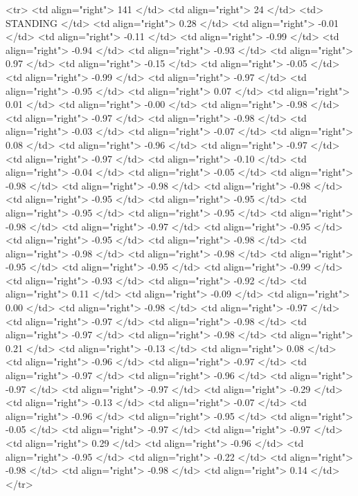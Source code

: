   <tr> <td align="right"> 141 </td> <td align="right">  24 </td> <td> STANDING </td> <td align="right"> 0.28 </td> <td align="right"> -0.01 </td> <td align="right"> -0.11 </td> <td align="right"> -0.99 </td> <td align="right"> -0.94 </td> <td align="right"> -0.93 </td> <td align="right"> 0.97 </td> <td align="right"> -0.15 </td> <td align="right"> -0.05 </td> <td align="right"> -0.99 </td> <td align="right"> -0.97 </td> <td align="right"> -0.95 </td> <td align="right"> 0.07 </td> <td align="right"> 0.01 </td> <td align="right"> -0.00 </td> <td align="right"> -0.98 </td> <td align="right"> -0.97 </td> <td align="right"> -0.98 </td> <td align="right"> -0.03 </td> <td align="right"> -0.07 </td> <td align="right"> 0.08 </td> <td align="right"> -0.96 </td> <td align="right"> -0.97 </td> <td align="right"> -0.97 </td> <td align="right"> -0.10 </td> <td align="right"> -0.04 </td> <td align="right"> -0.05 </td> <td align="right"> -0.98 </td> <td align="right"> -0.98 </td> <td align="right"> -0.98 </td> <td align="right"> -0.95 </td> <td align="right"> -0.95 </td> <td align="right"> -0.95 </td> <td align="right"> -0.95 </td> <td align="right"> -0.98 </td> <td align="right"> -0.97 </td> <td align="right"> -0.95 </td> <td align="right"> -0.95 </td> <td align="right"> -0.98 </td> <td align="right"> -0.98 </td> <td align="right"> -0.98 </td> <td align="right"> -0.95 </td> <td align="right"> -0.95 </td> <td align="right"> -0.99 </td> <td align="right"> -0.93 </td> <td align="right"> -0.92 </td> <td align="right"> 0.11 </td> <td align="right"> -0.09 </td> <td align="right"> 0.00 </td> <td align="right"> -0.98 </td> <td align="right"> -0.97 </td> <td align="right"> -0.97 </td> <td align="right"> -0.98 </td> <td align="right"> -0.97 </td> <td align="right"> -0.98 </td> <td align="right"> 0.21 </td> <td align="right"> -0.13 </td> <td align="right"> 0.08 </td> <td align="right"> -0.96 </td> <td align="right"> -0.97 </td> <td align="right"> -0.97 </td> <td align="right"> -0.96 </td> <td align="right"> -0.97 </td> <td align="right"> -0.97 </td> <td align="right"> -0.29 </td> <td align="right"> -0.13 </td> <td align="right"> -0.07 </td> <td align="right"> -0.96 </td> <td align="right"> -0.95 </td> <td align="right"> -0.05 </td> <td align="right"> -0.97 </td> <td align="right"> -0.97 </td> <td align="right"> 0.29 </td> <td align="right"> -0.96 </td> <td align="right"> -0.95 </td> <td align="right"> -0.22 </td> <td align="right"> -0.98 </td> <td align="right"> -0.98 </td> <td align="right"> 0.14 </td> </tr>
